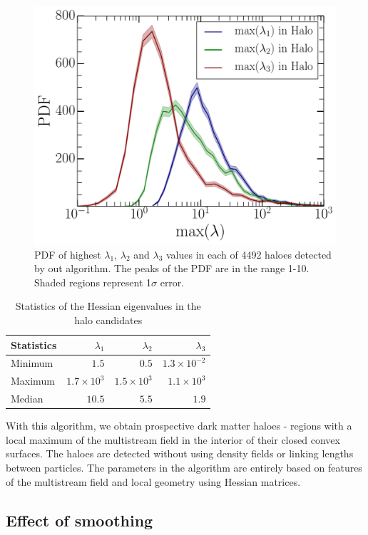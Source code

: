 \documentclass[fleqn,usenatbib,useAMS]{mnras}
\begin{document}
{\begin{figure}
\begin{minipage}[t]{.99\linewidth}
 \centering\includegraphics[width=8.cm]{fig4.pdf} 
\end{minipage}\hfill
\caption{PDF of highest $\lambda_1$, $\lambda_2$ and $\lambda_3$ values in each of 4492 haloes detected by out algorithm. The peaks of the PDF are in the range 1-10. Shaded regions represent 1$\sigma$ error. }
\label{fig:maxL3}
\end{figure}

\begin{table}
  \caption{Statistics of the Hessian eigenvalues in the halo candidates}
\begin{tabular}{|l|r|r|r|}
\hline
Statistics                &  $\lambda_1$ &  $\lambda_2$ &  $\lambda_3$\\ \hline
Minimum   & $ 1.5 $ & $ 0.5 $ & $ 1.3 \times 10^{-2} $  \\ \hline
Maximum  & $1.7 \times 10^3$  & $1.5 \times 10^3$ & $1.1 \times 10^3$     \\ \hline
Median     & $10.5$  & $5.5$ & $1.9$  \\ \hline
\end{tabular}
\label{tab:maxL3}
\end{table}

 
With this algorithm, we obtain prospective dark matter haloes - regions with a local maximum of the multistream field in the interior of their closed convex surfaces. The haloes are detected without using density fields or linking lengths between particles. The parameters in the algorithm are entirely based on features of the multistream field and local geometry using Hessian matrices. 


\subsection{Effect of smoothing}
\label{sub:Smooth}


}
\end{document}
